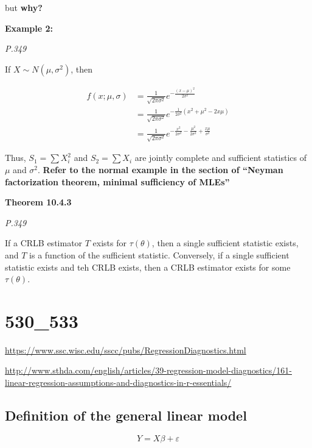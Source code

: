 \documentclass[]{book}
\begin{document}
but \textbf{why?}

\textbf{Example 2:}

\emph{P.349}

If \(X \sim N(\mu,\sigma^2)\), then

\[\begin{aligned} f(x;\mu,\sigma)&=\frac{1}{\sqrt{2\pi \sigma^2}}e^{-\frac{(x-\mu)^2}{2\sigma^2}} \\ &=\frac{1}{\sqrt{2\pi \sigma^2}}e^{-\frac{1}{2\sigma^2}(x^2+\mu^2-2x\mu)} \\ &=\frac{1}{\sqrt{2\pi \sigma^2}}e^{-\frac{x^2}{2\sigma^2}-\frac{\mu^2}{2\sigma^2}+\frac{x\mu}{\sigma^2}} \end{aligned}\]

Thus, \(S_1=\sum X_i^2\) and \(S_2=\sum X_i\) are jointly complete and sufficient statistics of \(\mu\) and \(\sigma^2\). \textbf{Refer to the normal example in the section of ``Neyman factorization theorem, minimal sufficiency of MLEs''}

\textbf{Theorem 10.4.3}

\emph{P.349}

If a CRLB estimator \(T\) exists for \(\tau(\theta)\), then a single sufficient statistic exists, and \(T\) is a function of the sufficient statistic. Conversely, if a single sufficient statistic exists and teh CRLB exists, then a CRLB estimator exists for some \(\tau(\theta)\).

\hypertarget{section-2}{%
\chapter{530\_533}\label{section-2}}

\url{https://www.ssc.wisc.edu/sscc/pubs/RegressionDiagnostics.html}

\url{http://www.sthda.com/english/articles/39-regression-model-diagnostics/161-linear-regression-assumptions-and-diagnostics-in-r-essentials/}

\hypertarget{definition-of-the-general-linear-model}{%
\section{Definition of the general linear model}\label{definition-of-the-general-linear-model}}

\[Y=X\beta+\varepsilon\]
\end{document}
